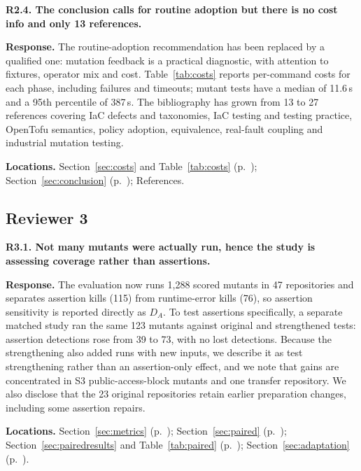 \medskip
\noindent\textbf{R2.4. The conclusion calls for routine adoption but there is no cost info and only 13 references.}\par
\textbf{Response.} The routine-adoption recommendation has been replaced by a qualified one: mutation feedback is a practical diagnostic, with attention to fixtures, operator mix and cost. Table~\ref{tab:costs} reports per-command costs for each phase, including failures and timeouts; mutant tests have a median of 11.6\,s and a 95th percentile of 387\,s. The bibliography has grown from 13 to 27 references covering IaC defects and taxonomies, IaC testing and testing practice, OpenTofu semantics, policy adoption, equivalence, real-fault coupling and industrial mutation testing.\par
\textbf{Locations.} Section~\ref{sec:costs} and Table~\ref{tab:costs} (p.~\pageref{tab:costs}); Section~\ref{sec:conclusion} (p.~\pageref{sec:conclusion}); References.

\subsection*{Reviewer 3}
\noindent\textbf{R3.1. Not many mutants were actually run, hence the study is assessing coverage rather than assertions.}\par
\textbf{Response.} The evaluation now runs 1,288 scored mutants in 47 repositories and separates assertion kills (115) from runtime-error kills (76), so assertion sensitivity is reported directly as $D_A$. To test assertions specifically, a separate matched study ran the same 123 mutants against original and strengthened tests: assertion detections rose from 39 to 73, with no lost detections. Because the strengthening also added runs with new inputs, we describe it as test strengthening rather than an assertion-only effect, and we note that gains are concentrated in S3 public-access-block mutants and one transfer repository. We also disclose that the 23 original repositories retain earlier preparation changes, including some assertion repairs.\par
\textbf{Locations.} Section~\ref{sec:metrics} (p.~\pageref{sec:metrics}); Section~\ref{sec:paired} (p.~\pageref{sec:paired}); Section~\ref{sec:pairedresults} and Table~\ref{tab:paired} (p.~\pageref{tab:paired}); Section~\ref{sec:adaptation} (p.~\pageref{sec:adaptation}).

